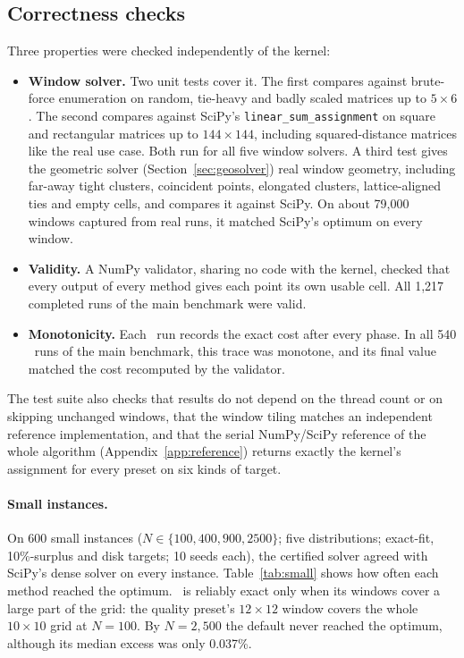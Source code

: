 \subsection{Correctness checks}
\label{sec:correctness}

Three properties were checked independently of the kernel:
\begin{itemize}
\item \textbf{Window solver.} Two unit tests cover it. The first compares against brute-force
  enumeration on random, tie-heavy and badly scaled matrices up to $5\times6$. The second
  compares against SciPy's \texttt{linear\_sum\_assignment} on square and rectangular
  matrices up to $144\times144$, including squared-distance matrices like the real use
  case. Both run for all five window solvers. A third test gives the geometric solver
  (Section~\ref{sec:geosolver}) real window geometry, including far-away tight clusters,
  coincident points, elongated clusters, lattice-aligned ties and empty cells, and compares
  it against SciPy. On about 79{,}000 windows captured from real runs, it matched SciPy's
  optimum on every window.
\item \textbf{Validity.} A NumPy validator, sharing no code with the kernel, checked that
  every output of every method gives each point its own usable cell. All 1{,}217 completed
  runs of the main benchmark were valid.
\item \textbf{Monotonicity.} Each \ShuffleSnap\ run records the exact cost after every phase.
  In all 540 \ShuffleSnap\ runs of the main benchmark, this trace was monotone, and its
  final value matched the cost recomputed by the validator.
\end{itemize}
The test suite also checks that results do not depend on the thread count or on
skipping unchanged windows, that the window tiling matches an independent
reference implementation, and that the serial NumPy/SciPy reference of the whole algorithm
(Appendix~\ref{app:reference}) returns exactly the kernel's assignment for every preset on
six kinds of target.

\paragraph{Small instances.} On 600 small instances
($N\in\{100,400,900,2500\}$; five distributions; exact-fit, 10\%-surplus and disk
targets; 10 seeds each), the certified solver agreed with SciPy's dense solver on
every instance. Table~\ref{tab:small} shows how often each method reached the
optimum. \ShuffleSnap\ is reliably exact only when its windows cover a large part of the
grid: the quality preset's $12\times12$ window covers the whole $10\times10$ grid at $N=100$.
By $N=2{,}500$ the default never reached the optimum, although its median excess was only
0.037\%.

